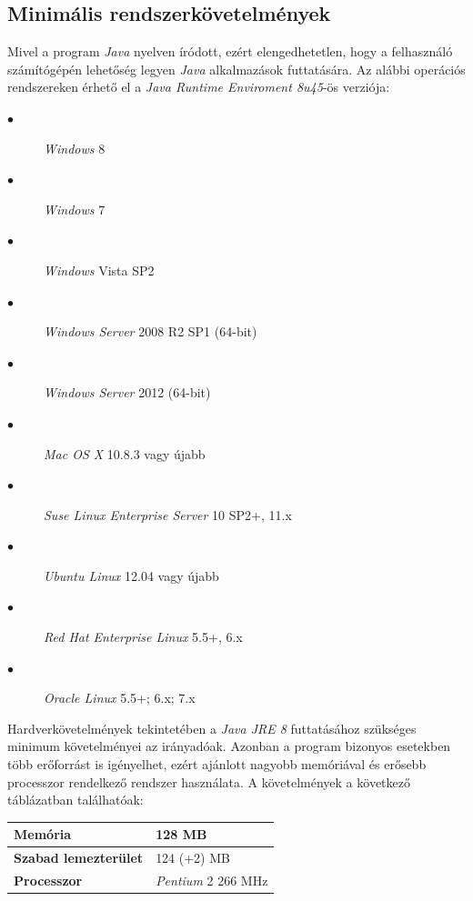 \documentclass{elteikthesis}
\begin{document}
\subsection{Minimális rendszerkövetelmények}
Mivel a program \emph{Java} nyelven íródott, ezért elengedhetetlen, hogy a felhasználó számítógépén lehetőség legyen \emph{Java} alkalmazások futtatására. Az alábbi operációs rendszereken érhető el a \emph{Java Runtime Enviroment 8u45}-ös verziója:\par
\begin{description}
	\item[$\bullet$] \emph{Windows} 8
	\item[$\bullet$] \emph{Windows} 7
	\item[$\bullet$] \emph{Windows} Vista SP2
	\item[$\bullet$] \emph{Windows Server} 2008 R2 SP1 (64-bit)
	\item[$\bullet$] \emph{Windows Server} 2012 (64-bit)
	\item[$\bullet$] \emph{Mac OS X} 10.8.3 vagy újabb
	\item[$\bullet$] \emph{Suse Linux Enterprise Server} 10 SP2+, 11.x
	\item[$\bullet$] \emph{Ubuntu Linux} 12.04 vagy újabb
	\item[$\bullet$] \emph{Red Hat Enterprise Linux} 5.5+, 6.x
	\item[$\bullet$] \emph{Oracle Linux} 5.5+; 6.x; 7.x
\end{description}
Hardverkövetelmények tekintetében a \emph{Java JRE 8} futtatásához szükséges
minimum követelményei az irányadóak. Azonban a program bizonyos esetekben több erőforrást is igényelhet, ezért ajánlott nagyobb memóriával és erősebb processzor rendelkező rendszer használata. A követelmények a következő táblázatban találhatóak:\par
\begin{table}[h]
		\def\arraystretch{2}
		\centering
	\begin{tabular}{|l|l|}
		\hline
		\textbf{Memória}           & 128 MB            \\ \hline
		\textbf{Szabad lemezterület} & 124 (+2) MB       \\ \hline
		\textbf{Processzor}          & \emph{Pentium} 2 266 MHz \\ \hline
	\end{tabular}
\end{table}
\end{document}
